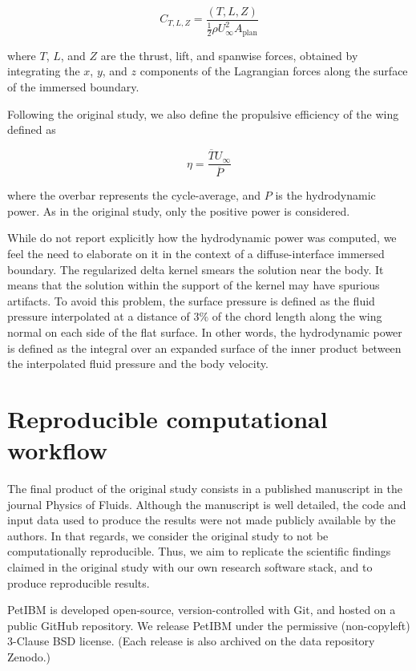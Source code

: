 \begin{equation}
  C_{T, L, Z} = \frac{\left( T, L, Z \right)}{\frac{1}{2} \rho U_\infty^2 A_\text{plan}}
\end{equation}

where $T$, $L$, and $Z$ are the thrust, lift, and spanwise forces, obtained by integrating the $x$, $y$, and $z$ components of the Lagrangian forces along the surface of the immersed boundary.

Following the original study, we also define the propulsive efficiency of the wing defined as

\begin{equation}
  \eta = \frac{\overline{T} U_\infty}{\overline{P}}
\end{equation}

where the overbar represents the cycle-average, and $P$ is the hydrodynamic power.
As in the original study, only the positive power is considered.

While \citet{li_dong_2016} do not report explicitly how the hydrodynamic power was computed, we feel the need to elaborate on it in the context of a diffuse-interface immersed boundary.
The regularized delta kernel smears the solution near the body.
It means that the solution within the support of the kernel may have spurious artifacts.
To avoid this problem, the surface pressure is defined as the fluid pressure interpolated at a distance of $3\%$ of the chord length along the wing normal on each side of the flat surface.
In other words, the hydrodynamic power is defined as the integral over an expanded surface of the inner product between the interpolated fluid pressure and the body velocity.

\section{Reproducible computational workflow}

The final product of the original study consists in a published manuscript in the journal Physics of Fluids.
Although the manuscript is well detailed, the code and input data used to produce the results were not made publicly available by the authors.
In that regards, we consider the original study to not be computationally reproducible.
Thus, we aim to replicate the scientific findings claimed in the original study with our own research software stack, and to produce reproducible results.

PetIBM\supercite{chuang_et_al_2018} is developed open-source, version-controlled with Git, and hosted on a public GitHub repository.
We release PetIBM under the permissive (non-copyleft) 3-Clause BSD license.
(Each release is also archived on the data repository Zenodo.)

